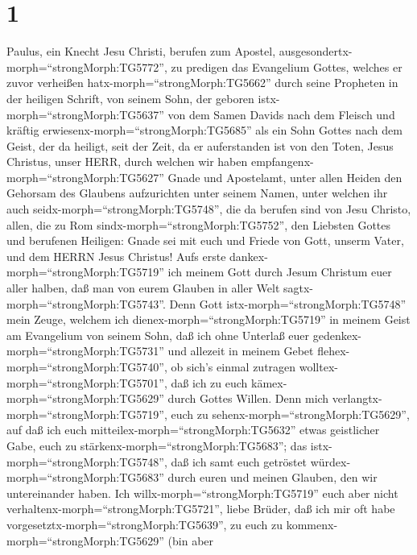 \hypertarget{section}{%
\section{1}\label{section}}

 Paulus, ein Knecht Jesu Christi, berufen zum Apostel,
ausgesondertx-morph=``strongMorph:TG5772'', zu predigen das Evangelium
Gottes,  welches er zuvor verheißen
hatx-morph=``strongMorph:TG5662'' durch seine Propheten in der heiligen
Schrift,  von seinem Sohn, der geboren
istx-morph=``strongMorph:TG5637'' von dem Samen Davids nach dem Fleisch
 und kräftig erwiesenx-morph=``strongMorph:TG5685'' als ein
Sohn Gottes nach dem Geist, der da heiligt, seit der Zeit, da er
auferstanden ist von den Toten, Jesus Christus, unser HERR, 
durch welchen wir haben empfangenx-morph=``strongMorph:TG5627'' Gnade
und Apostelamt, unter allen Heiden den Gehorsam des Glaubens
aufzurichten unter seinem Namen,  unter welchen ihr auch
seidx-morph=``strongMorph:TG5748'', die da berufen sind von Jesu
Christo,  allen, die zu Rom
sindx-morph=``strongMorph:TG5752'', den Liebsten Gottes und berufenen
Heiligen: Gnade sei mit euch und Friede von Gott, unserm Vater, und dem
HERRN Jesus Christus!  Aufs erste
dankex-morph=``strongMorph:TG5719'' ich meinem Gott durch Jesum Christum
euer aller halben, daß man von eurem Glauben in aller Welt
sagtx-morph=``strongMorph:TG5743''.  Denn Gott
istx-morph=``strongMorph:TG5748'' mein Zeuge, welchem ich
dienex-morph=``strongMorph:TG5719'' in meinem Geist am Evangelium von
seinem Sohn, daß ich ohne Unterlaß euer
gedenkex-morph=``strongMorph:TG5731''  und allezeit in
meinem Gebet flehex-morph=``strongMorph:TG5740'', ob sich's einmal
zutragen wolltex-morph=``strongMorph:TG5701'', daß ich zu euch
kämex-morph=``strongMorph:TG5629'' durch Gottes Willen. 
Denn mich verlangtx-morph=``strongMorph:TG5719'', euch zu
sehenx-morph=``strongMorph:TG5629'', auf daß ich euch
mitteilex-morph=``strongMorph:TG5632'' etwas geistlicher Gabe, euch zu
stärkenx-morph=``strongMorph:TG5683'';  das
istx-morph=``strongMorph:TG5748'', daß ich samt euch getröstet
würdex-morph=``strongMorph:TG5683'' durch euren und meinen Glauben, den
wir untereinander haben.  Ich
willx-morph=``strongMorph:TG5719'' euch aber nicht
verhaltenx-morph=``strongMorph:TG5721'', liebe Brüder, daß ich mir oft
habe vorgesetztx-morph=``strongMorph:TG5639'', zu euch zu
kommenx-morph=``strongMorph:TG5629'' (bin aber
